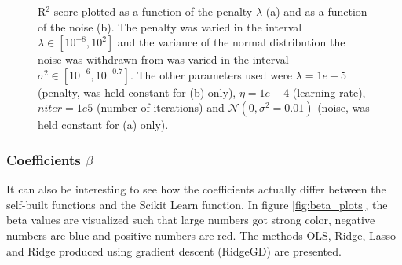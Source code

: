 \begin{figure} [H]%
	\centering
	\caption{R$^2$-score plotted as a function of the penalty $\lambda$ (a) and as a function of the noise (b). The penalty was varied in the interval $\lambda\in[10^{-8},10^2]$ and the variance of the normal distribution the noise was withdrawn from was varied in the interval $\sigma^2\in[10^{-6},10^{-0.7}]$. The other parameters used were $\lambda=1e-5$ (penalty, was held constant for (b) only), $\eta=1e-4$ (learning rate), $niter=1e5$ (number of iterations) and $\mathcal{N}(0, \sigma^2=0.01)$ (noise, was held constant for (a) only).}%
	\label{fig:R2_scores}
\end{figure}

\subsubsection{Coefficients $\beta$}
It can also be interesting to see how the coefficients actually differ between the self-built functions and the Scikit Learn function. In figure \eqref{fig:beta_plots}, the beta values are visualized such that large numbers got strong color, negative numbers are blue and positive numbers are red. The methods OLS, Ridge, Lasso and Ridge produced using gradient descent (RidgeGD) are presented. 

